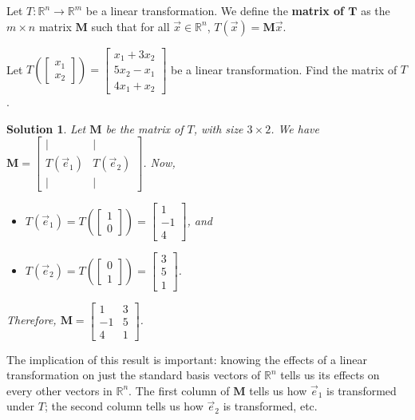 \documentclass[]{book}
\newcommand{\vecxx}[1][x]{\ensuremath{\begin{bmatrix}
#1_1 \\
#1_2
\end{bmatrix}}}
\newcommand{\sbvec}[1]{\ensuremath{\vec{e}_#1}}
\newcommand{\mat}[1]{\ensuremath{\mathbf{#1}}}
\newcommand{\R}{\ensuremath{\mathbb{R}}}
\newcommand{\Rn}{\ensuremath{\R^n}}
\newcommand{\Rm}{\ensuremath{\R^m}}
\newtheorem*{solution}{Solution}
\begin{document}
\begin{definition}
    Let $T:\Rn \to \Rm$ be a linear transformation. We define the \textbf{matrix of $\pmb{T}$} as the $m \times n$ matrix $\mat{M}$ such that for all $\vec{x} \in \Rn$, $T(\vec{x})=\mat{M}\vec{x}$.
\end{definition}
\begin{example}
    Let $T\left(\vecxx\right) = \begin{bmatrix}x_1 + 3x_2 \\ 5x_2 - x_1 \\ 4x_1 + x_2\end{bmatrix}$ be a linear transformation. Find the matrix of $T$.
\begin{solution}
    Let $\mat{M}$ be the matrix of $T$, with size $3 \times 2$. We have
    $\mat{M} = \begin{bmatrix}\vert & \vert \\ T(\sbvec{1}) & T(\sbvec{2}) \\ \vert & \vert\end{bmatrix}$.
    Now, 
    \begin{itemize}
        \item $T(\sbvec{1}) = T\left(\begin{bmatrix}1 \\ 0\end{bmatrix}\right) = \begin{bmatrix}1 \\ -1 \\ 4\end{bmatrix}$, and
        \item $T(\sbvec{2}) = T\left(\begin{bmatrix}0 \\ 1\end{bmatrix}\right) = \begin{bmatrix}3 \\ 5 \\ 1\end{bmatrix}$.
    \end{itemize}

    Therefore, $\mat{M} = \begin{bmatrix}1 & 3 \\ -1 & 5 \\ 4 & 1\end{bmatrix}$. \hfill \qedsymbol
\end{solution}
\end{example}

The implication of this result is important: knowing the effects of a linear transformation on just the standard basis vectors of $\R^n$ tells us its effects on every other vectors in $\R^n$. The first column of $\mat{M}$ tells us how $\sbvec{1}$ is transformed under $T$; the second column tells us how $\sbvec{2}$ is transformed, etc. 
\end{document}

